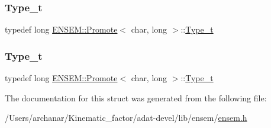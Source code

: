 \subsubsection{\texorpdfstring{Type\_t}{Type\_t}\hspace{0.1cm}{\footnotesize\ttfamily [2/3]}}
{\footnotesize\ttfamily typedef long \mbox{\hyperlink{structENSEM_1_1Promote}{E\+N\+S\+E\+M\+::\+Promote}}$<$ char, long $>$\+::\mbox{\hyperlink{structENSEM_1_1Promote_3_01char_00_01long_01_4_af2c2227ccd58ab5b06ad3e9b368ec6d3}{Type\+\_\+t}}}

\mbox{\label{structENSEM_1_1Promote_3_01char_00_01long_01_4_af2c2227ccd58ab5b06ad3e9b368ec6d3}} 
\subsubsection{\texorpdfstring{Type\_t}{Type\_t}\hspace{0.1cm}{\footnotesize\ttfamily [3/3]}}
{\footnotesize\ttfamily typedef long \mbox{\hyperlink{structENSEM_1_1Promote}{E\+N\+S\+E\+M\+::\+Promote}}$<$ char, long $>$\+::\mbox{\hyperlink{structENSEM_1_1Promote_3_01char_00_01long_01_4_af2c2227ccd58ab5b06ad3e9b368ec6d3}{Type\+\_\+t}}}



The documentation for this struct was generated from the following file\+:\begin{DoxyCompactItemize}
\item 
/\+Users/archanar/\+Kinematic\+\_\+factor/adat-\/devel/lib/ensem/\mbox{\hyperlink{adat-devel_2lib_2ensem_2ensem_8h}{ensem.\+h}}\end{DoxyCompactItemize}
